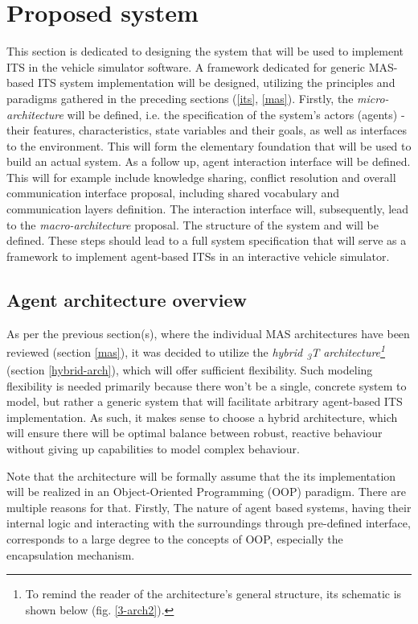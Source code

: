 \documentclass[main.tex]{subfiles}
\begin{document}
    
\section{Proposed system}\label{sec-system}

This section is dedicated to designing the system that will be used to implement ITS in the
vehicle simulator software. A framework dedicated for generic MAS-based ITS system
implementation will be designed, utilizing the principles and paradigms gathered in the
preceding sections (\ref{its}, \ref{mas}). Firstly, the \emph{micro-architecture} will be
defined, i.e. the specification of the system's actors (agents) - their features,
characteristics, state variables and their goals, as well as interfaces to the environment.
This will form the elementary foundation that will be used to build an actual system. As a
follow up, agent interaction interface will be defined. This will for example include
knowledge sharing, conflict resolution and overall communication interface proposal, including
shared vocabulary and communication layers definition. The interaction interface will,
subsequently, lead to the \emph{macro-architecture} proposal. The structure of the system and
will be defined. These steps should lead to a full system specification that will serve as a
framework to implement agent-based ITSs in an interactive vehicle simulator.

\subsection{Agent architecture overview}

As per the previous section(s), where the individual MAS architectures have been reviewed
(section \ref{mas}), it was decided to utilize  the \emph{hybrid \textsubscript{3}T
architecture\footnote{To remind the reader of the architecture's general structure, its
schematic is shown below (fig. \ref{3-arch2}).}} (section \ref{hybrid-arch}), which will offer
sufficient flexibility.  Such modeling flexibility is needed primarily because there won't be a
single, concrete system to model, but rather a generic system that will facilitate arbitrary
agent-based ITS implementation. As such, it makes sense to choose a hybrid architecture, which
will ensure there will be optimal balance between robust, reactive behaviour without giving up
capabilities to model complex behaviour.

Note that the architecture will be formally assume that the its implementation will be realized 
in an Object-Oriented Programming (OOP) paradigm. There are multiple reasons for that. Firstly, 
The nature of agent based systems, having their internal logic and interacting with the surroundings 
through pre-defined interface, corresponds to a large degree to the concepts of OOP, especially
the encapsulation mechanism.
\end{document}
